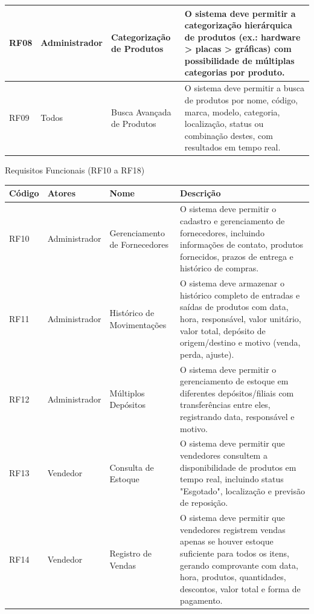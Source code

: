 \documentclass[
	12pt,				%
	openright,			%
	twoside,			%
	a4paper,			%
	english,			%
	french,				%
	spanish,			%
	brazil				%
	]{abntex2}
\begin{document}
\begin{quadro}[htb]
\begin{tabular}{|p{1.0cm}|p{2.8cm}|p{4.2cm}|p{7.0cm}|}
    RF08 & Administrador & Categorização de Produtos & O sistema deve permitir a categorização hierárquica de produtos (ex.: hardware > placas > gráficas) com possibilidade de múltiplas categorias por produto. \\ \hline

    RF09 & Todos & Busca Avançada de Produtos & O sistema deve permitir a busca de produtos por nome, código, marca, modelo, categoria, localização, status ou combinação destes, com resultados em tempo real. \\ \hline


\end{tabular}
\end{quadro}

\FloatBarrier


\begin{quadro}[htb]
\caption{\label{quadro_rf2}Requisitos Funcionais (RF10 a RF18)}
\begin{tabular}{|p{1.0cm}|p{2.8cm}|p{4.2cm}|p{7.0cm}|}
    \hline
    \textbf{Código} & \textbf{Atores} & \textbf{Nome} & \textbf{Descrição} \\ \hline

    RF10 & Administrador & Gerenciamento de Fornecedores & O sistema deve permitir o cadastro e gerenciamento de fornecedores, incluindo informações de contato, produtos fornecidos, prazos de entrega e histórico de compras. \\ \hline

    RF11 & Administrador & Histórico de Movimentações & O sistema deve armazenar o histórico completo de entradas e saídas de produtos com data, hora, responsável, valor unitário, valor total, depósito de origem/destino e motivo (venda, perda, ajuste). \\ \hline

    RF12 & Administrador & Múltiplos Depósitos & O sistema deve permitir o gerenciamento de estoque em diferentes depósitos/filiais com transferências entre eles, registrando data, responsável e motivo. \\ \hline

    RF13 & Vendedor & Consulta de Estoque & O sistema deve permitir que vendedores consultem a disponibilidade de produtos em tempo real, incluindo status "Esgotado", localização e previsão de reposição. \\ \hline

    RF14 & Vendedor & Registro de Vendas & O sistema deve permitir que vendedores registrem vendas apenas se houver estoque suficiente para todos os itens, gerando comprovante com data, hora, produtos, quantidades, descontos, valor total e forma de pagamento. \\ \hline


\end{tabular}
\end{quadro}
\end{document}
